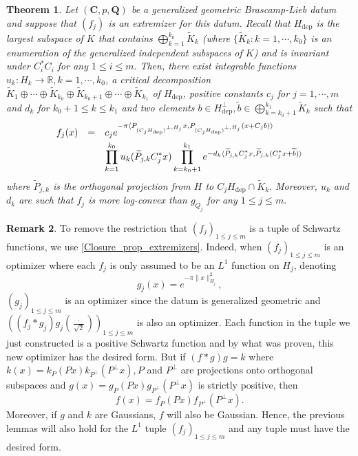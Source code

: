 \documentclass[11pt,a4paper,reqno]{amsart}
\numberwithin{equation}{section}
\newtheorem{theorem}{Theorem}[section]
\theoremstyle{definition}
\newtheorem{remark}[theorem]{Remark}
\newcommand{\nm}{\noalign{\smallskip}}
\newcommand{\ds}{\displaystyle}
\renewcommand{\tilde}{\widetilde}
\newcommand{\<}{\ensuremath \leq}
\renewcommand{\>}{\ensuremath \geq}
\renewcommand{\tilde}{\widetilde}
\begin{document}
\begin{theorem} \label{Main_Thm_Eq_Geometric_BL}
Let $(\textbf{C},p,\textbf{Q})$ be a generalized geometric Brascamp-Lieb datum and suppose that $(f_j)$ is an extremizer for this datum. 
Recall that $H_{\mathrm{dep}}$ is the largest subspace of $K$ that contains $\bigoplus_{k=1}^{k_0}\tilde K_k$ (where $\{\tilde K_k : k=1,\cdots,k_0\}$ is an enumeration of the generalized independent subspaces of $K$) and is invariant under $C_i^*C_i$ for any $1 \leq i \leq m.$ Then, there exist integrable functions $u_k: H_k \rightarrow \mathbb{R}, k=1,\cdots,k_0$, a critical decomposition $\tilde K_1 \oplus \cdots \oplus \tilde K_{k_0} \oplus \tilde K_{k_0+1} \oplus \cdots \oplus \tilde K_{k_1}$ of $H_{\mathrm{dep}}$, positive constants $c_j$ for $j=1,\cdots,m$ and $d_k$ for $k_0+1 \leq k \leq k_1$ and two elements $b \in H_{\mathrm{dep}}^\perp, \tilde b \in \bigoplus_{k=k_0+1}^{k_1}\tilde K_k$ such that 
$$\begin{array}{lll}f_j(x) &=&
    
    \ds c_je^{-\pi \langle P_{(C_jH_{\mathrm{dep}})^{\perp,H_j}}x,P_{(C_jH_{\mathrm{dep}})^{\perp,H_j}}(x+C_jb)\rangle} \\
    \nm 
    && \ds \prod_{k=1}^{k_0}u_k(\tilde P_{j,k}C_j^*x)\prod_{k=k_0+1}^{k_1}e^{-d_k \langle \tilde P_{j,k}C_j^*x,\tilde P_{j,k}(C_j^*x+\tilde b)\rangle} \end{array}$$ where $\tilde P_{j,k}$ is the orthogonal projection from $H$ to $C_jH_{\mathrm{dep}} \cap \tilde K_k.$ 
    Moreover, $u_k$ and $d_k $ are such that $f_j$ is more log-convex than $g_{Q_j}$ for any $1 \leq j \leq m.$
\end{theorem}


\begin{remark}
    To remove the restriction that $(f_j)_{1 \leq j \leq m}$ is a tuple of Schwartz functions, we use \cref{Closure_prop_extremizers}. Indeed, when $(f_j)_{1 \leq j \leq m}$ is an optimizer where each $f_j$ is only assumed to be an $L^1$ function on $H_j$, denoting $$g_j(x)=e^{-\pi \|x\|^2_{H_j}},$$ $(g_j)_{1 \leq j \leq m}$ is an optimizer since the datum is generalized geometric and $((f_j * g_j)g_j(\frac{\cdot}{\sqrt 2}))_{1 \leq j \leq m}$ is also an optimizer. Each function in the  tuple we just constructed is a positive Schwartz function and by what was proven, this new optimizer has the desired form. But if $(f * g)g=k$ where $k(x)=k_P(Px)k_{P^\perp}(P^\perp x), P$ and $P^\perp$ are projections onto orthogonal subspaces and $g(x)=g_P(Px)g_{P^\perp}(P^\perp x)$ is strictly positive, then $$f(x)=f_P(Px)f_{P^\perp}(P^\perp x).$$ Moreover, if $g$ and $k$ are Gaussians, $f$ will also be Gaussian. Hence, the previous lemmas will also hold for the $L^1$ tuple $(f_j)_{1 \leq j \leq m}$ and any tuple must have the desired form. 
\end{remark}
\end{document}
